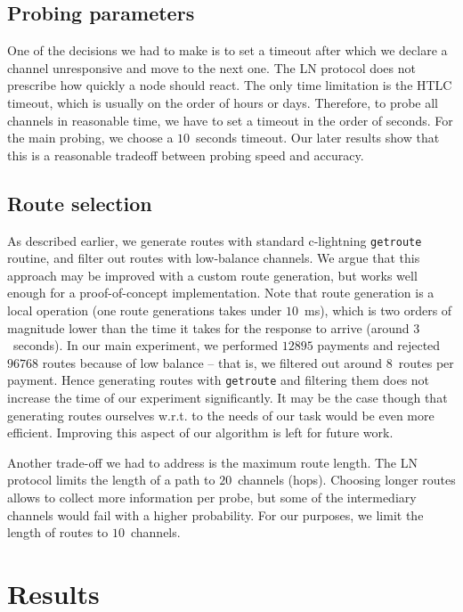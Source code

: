 \subsection{Probing parameters}
One of the decisions we had to make is to set a timeout after which we declare a channel unresponsive and move to the next one.
The LN protocol does not prescribe how quickly a node should react.
The only time limitation is the HTLC timeout, which is usually on the order of hours or days.
Therefore, to probe all channels in reasonable time, we have to set a timeout in the order of seconds.
For the main probing, we choose a $10$~seconds timeout.
Our later results show that this is a reasonable tradeoff between probing speed and accuracy.

\subsection{Route selection}

As described earlier, we generate routes with standard c-lightning \texttt{getroute} routine, and filter out routes with low-balance channels.
We argue that this approach may be improved with a custom route generation, but works well enough for a proof-of-concept implementation.
Note that route generation is a local operation (one route generations takes under $10$~ms), which is two orders of magnitude lower than the time it takes for the response to arrive (around $3$~seconds).
In our main experiment, we performed $12895$ payments and rejected $96768$ routes because of low balance -- that is, we filtered out around 8~routes per payment.
Hence generating routes with \texttt{getroute} and filtering them does not increase the time of our experiment significantly.
It may be the case though that generating routes ourselves w.r.t. to the needs of our task would be even more efficient.
Improving this aspect of our algorithm is left for future work.

Another trade-off we had to address is the maximum route length.
The LN protocol limits the length of a path to $20$~channels (hops).
Choosing longer routes allows to collect more information per probe, but some of the intermediary channels would fail with a higher probability.
For our purposes, we limit the length of routes to $10$~channels.




\section{Results} \label{sec:results}

